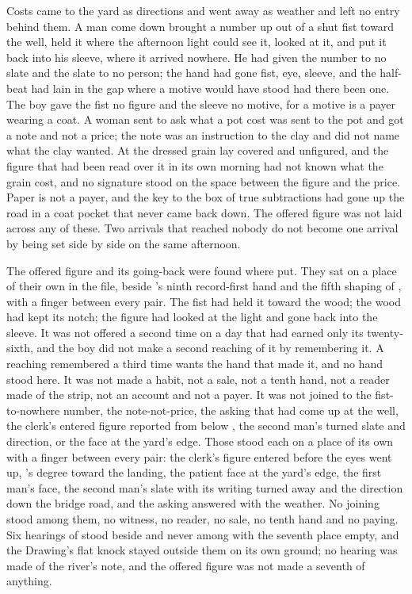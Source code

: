Costs came to the yard as directions and went away as weather and left no entry behind them. A man come down  brought a number up out of a shut fist toward the well, held it where the afternoon light could see it, looked at it, and put it back into his sleeve, where it arrived nowhere. He had given the number to no slate and the slate to no person; the hand had gone fist, eye, sleeve, and the half-beat had lain in the gap where a motive would have stood had there been one. The boy gave the fist no figure and the sleeve no motive, for a motive is a payer wearing a coat. A woman sent to ask what a pot cost was sent to the pot and got a note and not a price; the note was an instruction to the clay and did not name what the clay wanted. At  the dressed grain lay covered and unfigured, and the figure that had been read over it in its own morning had not known what the grain cost, and no signature stood on the space between the figure and the price. Paper is not a payer, and the key to the box of true subtractions had gone up the road in a coat pocket that never came back down. The offered figure was not laid across any of these. Two arrivals that reached nobody do not become one arrival by being set side by side on the same afternoon.

The offered figure and its going-back were found where put. They sat on a place of their own in the file, beside 's ninth record-first hand and the fifth shaping of , with a finger between every pair. The fist had held it toward the wood; the wood had kept its notch; the figure had looked at the light and gone back into the sleeve. It was not offered a second time on a day that had earned only its twenty-sixth, and the boy did not make a second reaching of it by remembering it. A reaching remembered a third time wants the hand that made it, and no hand stood here. It was not made a habit, not a sale, not a tenth hand, not a reader made of the strip, not an account and not a payer. It was not joined to the fist-to-nowhere number, the note-not-price, the asking that had come up at the well, the clerk's entered figure reported from below , the second man's turned slate and direction, or the face at the yard's edge. Those stood each on a place of its own with a finger between every pair: the clerk's figure entered before the eyes went up, 's degree toward the landing, the patient face at the yard's edge, the first man's face, the second man's slate with its writing turned away and the direction down the bridge road, and the asking answered with the weather. No joining stood among them, no witness, no reader, no sale, no tenth hand and no paying. Six hearings of  stood beside and never among with the seventh place empty, and the Drawing's flat knock stayed outside them on its own ground; no hearing was made of the river's note, and the offered figure was not made a seventh of anything.

